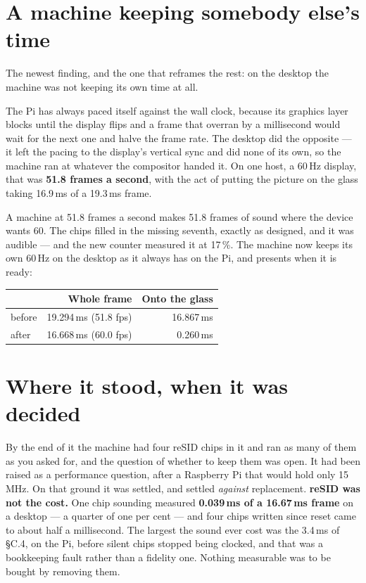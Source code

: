 \section{A machine keeping somebody else's time}
The newest finding, and the one that reframes the rest: on the desktop
the machine was not keeping its own time at all.

The Pi has always paced itself against the wall clock, because its
graphics layer blocks until the display flips and a frame that overran
by a millisecond would wait for the next one and halve the frame rate.
The desktop did the opposite --- it left the pacing to the display's
vertical sync and did none of its own, so the machine ran at whatever
the compositor handed it. On one host, a 60\,Hz display, that was
\textbf{51.8 frames a second}, with the act of putting the picture on
the glass taking 16.9\,ms of a 19.3\,ms frame.

A machine at 51.8 frames a second makes 51.8 frames of sound where the
device wants 60. The chips filled in the missing seventh, exactly as
designed, and it was audible --- and the new counter measured it at
17\,\%. The machine now keeps its own 60\,Hz on the desktop as it always
has on the Pi, and presents when it is ready:

\begin{center}
\small
\begin{tabular}{@{}l r r@{}}
\toprule
& \textbf{Whole frame} & \textbf{Onto the glass} \\
\midrule
before & 19.294\,ms (51.8 fps) & 16.867\,ms \\
after  & 16.668\,ms (60.0 fps) & 0.260\,ms \\
\bottomrule
\end{tabular}
\end{center}

\section{Where it stood, when it was decided}
By the end of it the machine had four reSID chips in it and ran as many
of them as you asked for, and the question of whether to keep them was
open. It had been raised as a performance question, after a Raspberry Pi
that would hold only 15\,MHz. On that ground it was settled, and settled
\emph{against} replacement. \textbf{reSID was not the cost.} One chip
sounding measured \textbf{0.039\,ms of a 16.67\,ms frame} on a desktop
--- a quarter of one per cent --- and four chips written since reset came
to about half a millisecond. The largest the sound ever cost was the
3.4\,ms of \S C.4, on the Pi, before silent chips stopped being clocked,
and that was a bookkeeping fault rather than a fidelity one. Nothing
measurable was to be bought by removing them.

